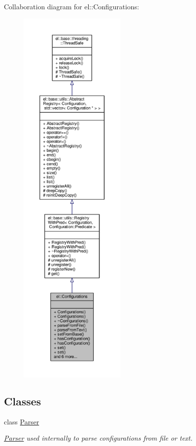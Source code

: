 Collaboration diagram for el\+:\+:Configurations\+:
\nopagebreak
\begin{figure}[H]
\begin{center}
\leavevmode
\includegraphics[height=550pt]{da/dba/classel_1_1Configurations__coll__graph}
\end{center}
\end{figure}
\subsection*{Classes}
\begin{DoxyCompactItemize}
\item 
class \hyperlink{classel_1_1Configurations_1_1Parser}{Parser}
\begin{DoxyCompactList}\small\item\em \hyperlink{classel_1_1Configurations_1_1Parser}{Parser} used internally to parse configurations from file or text. \end{DoxyCompactList}\end{DoxyCompactItemize}
